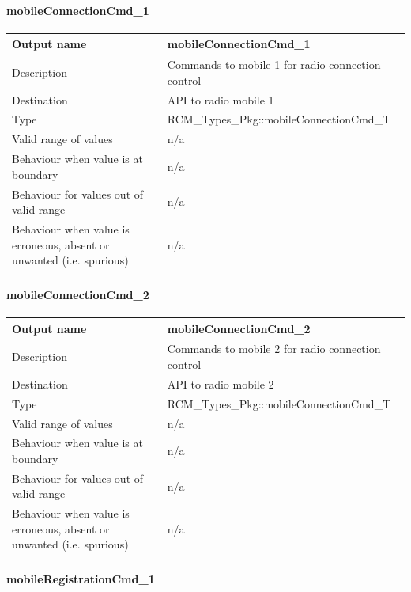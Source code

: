 \paragraph{mobileConnectionCmd\_1}

\begin{longtable}{p{}p{}}
	\toprule
	Output name				& mobileConnectionCmd\_1 \\
	\midrule
	Description				& Commands to mobile 1 for radio connection control  \\
	\midrule
	Destination				& API to radio mobile 1 \\ 
	\midrule
	Type					& RCM\_Types\_Pkg::mobileConnectionCmd\_T \\
	\midrule
	Valid range of values	& n/a \\
	\midrule
	Behaviour when value is at boundary	& n/a \\
	\midrule
	Behaviour for values out of valid range	& n/a \\
	\midrule
	Behaviour when value is erroneous, absent or unwanted (i.e. spurious) & n/a \\
	\bottomrule
\end{longtable}

\paragraph{mobileConnectionCmd\_2}

\begin{longtable}{p{}p{}}
	\toprule
	Output name				& mobileConnectionCmd\_2 \\
	\midrule
	Description				& Commands to mobile 2 for radio connection control  \\
	\midrule
	Destination				& API to radio mobile 2 \\ 
	\midrule
	Type					& RCM\_Types\_Pkg::mobileConnectionCmd\_T \\
	\midrule
	Valid range of values	& n/a \\
	\midrule
	Behaviour when value is at boundary	& n/a \\
	\midrule
	Behaviour for values out of valid range	& n/a \\
	\midrule
	Behaviour when value is erroneous, absent or unwanted (i.e. spurious) & n/a \\
	\bottomrule
\end{longtable}

\paragraph{mobileRegistrationCmd\_1}

